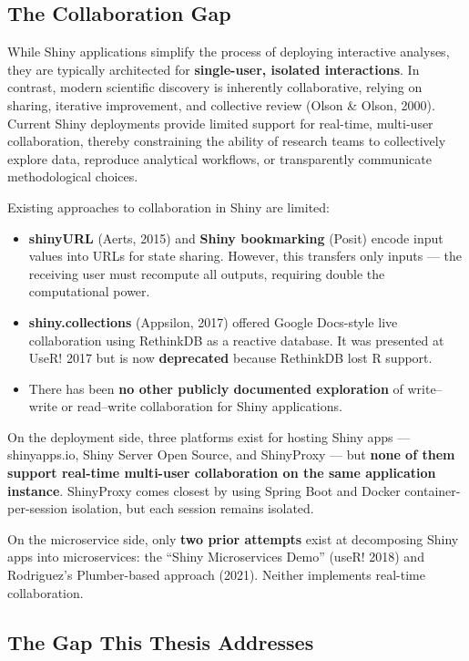 \documentclass[12pt,a4paper]{article}
\begin{document}
\subsection{The Collaboration Gap}

While Shiny applications simplify the process of deploying interactive analyses, they are typically architected for \textbf{single-user, isolated interactions}. In contrast, modern scientific discovery is inherently collaborative, relying on sharing, iterative improvement, and collective review (Olson \& Olson, 2000). Current Shiny deployments provide limited support for real-time, multi-user collaboration, thereby constraining the ability of research teams to collectively explore data, reproduce analytical workflows, or transparently communicate methodological choices.

Existing approaches to collaboration in Shiny are limited:

\begin{itemize}[nosep]
  \item \textbf{shinyURL} (Aerts, 2015) and \textbf{Shiny bookmarking} (Posit) encode input values into URLs for state sharing. However, this transfers only inputs --- the receiving user must recompute all outputs, requiring double the computational power.
  \item \textbf{shiny.collections} (Appsilon, 2017) offered Google Docs-style live collaboration using RethinkDB as a reactive database. It was presented at UseR! 2017 but is now \textbf{deprecated} because RethinkDB lost R support.
  \item There has been \textbf{no other publicly documented exploration} of write--write or read--write collaboration for Shiny applications.
\end{itemize}

On the deployment side, three platforms exist for hosting Shiny apps --- shinyapps.io, Shiny Server Open Source, and ShinyProxy --- but \textbf{none of them support real-time multi-user collaboration on the same application instance}. ShinyProxy comes closest by using Spring Boot and Docker container-per-session isolation, but each session remains isolated.

On the microservice side, only \textbf{two prior attempts} exist at decomposing Shiny apps into microservices: the ``Shiny Microservices Demo'' (useR! 2018) and Rodriguez's Plumber-based approach (2021). Neither implements real-time collaboration.

\subsection{The Gap This Thesis Addresses}
\end{document}
